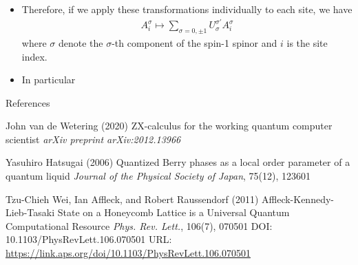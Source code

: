 \documentclass[aspectratio=169,xcolor=dvipsnames, t]{beamer}
\begin{document}
\begin{frame}
    \begin{itemize}
        \item Therefore, if we apply these transformations individually to each site, we have \begin{align*}
            A^{\sigma}_i \mapsto \sum_{\sigma=0,\pm 1}U^{\sigma'}_{\sigma} A_i^{\sigma}
        \end{align*}
        where $\sigma$ denote the $\sigma$-th component of the spin-1 spinor and $i$ is the site index.
        \item In particular 
    \end{itemize}
\end{frame}



\begin{frame}{References}
    \footnotesize{
        \begin{thebibliography}{99}

             John van de Wetering (2020)
            \newblock ZX-calculus for the working quantum computer scientist
            \newblock \emph{arXiv preprint arXiv:2012.13966}
            
             Yasuhiro Hatsugai (2006)
            \newblock Quantized Berry phases as a local order parameter of a quantum liquid
            \newblock \emph{Journal of the Physical Society of Japan}, 75(12), 123601

             Tzu-Chieh Wei, Ian Affleck, and Robert Raussendorf (2011)
            \newblock Affleck-Kennedy-Lieb-Tasaki State on a Honeycomb Lattice is a Universal Quantum Computational Resource
            \newblock \emph{Phys. Rev. Lett.}, 106(7), 070501 DOI: 10.1103/PhysRevLett.106.070501
            \newblock URL: \url{https://link.aps.org/doi/10.1103/PhysRevLett.106.070501}
        \end{thebibliography}
    }
\end{frame}

\makefinalpage
\end{document}
